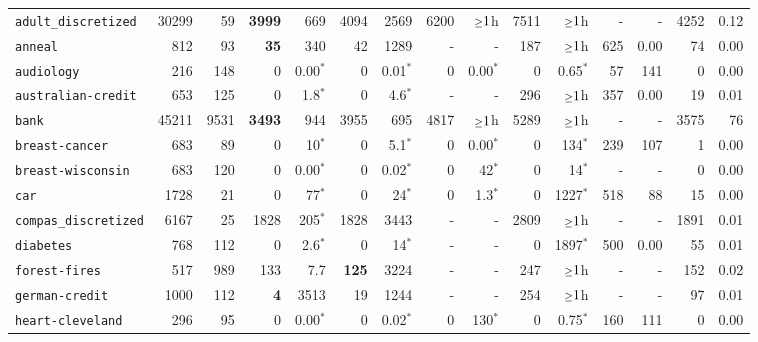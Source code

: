 \begin{tabular}{lccrrrrrrrrrrrr}
\texttt{adult\_discretized} & \multicolumn{1}{r}{30299} & \multicolumn{1}{r}{59}  & \textbf{3999} & 669 & 4094 & 2569 & 6200 & $\mathsmaller{\geq}1$h & 7511 & $\mathsmaller{\geq}1$h & - & - & 4252 & 0.12\\
\texttt{anneal} & \multicolumn{1}{r}{812} & \multicolumn{1}{r}{93}  & \textbf{35} & 340 & 42 & 1289 & - & - & 187 & $\mathsmaller{\geq}1$h & 625 & 0.00 & 74 & 0.00\\
\texttt{audiology} & \multicolumn{1}{r}{216} & \multicolumn{1}{r}{148}  & 0 & 0.00$^*$ & 0 & 0.01$^*$ & 0 & 0.00$^*$ & 0 & 0.65$^*$ & 57 & 141 & 0 & 0.00\\
\texttt{australian-credit} & \multicolumn{1}{r}{653} & \multicolumn{1}{r}{125}  & 0 & 1.8$^*$ & 0 & 4.6$^*$ & - & - & 296 & $\mathsmaller{\geq}1$h & 357 & 0.00 & 19 & 0.01\\
\texttt{bank} & \multicolumn{1}{r}{45211} & \multicolumn{1}{r}{9531}  & \textbf{3493} & 944 & 3955 & 695 & 4817 & $\mathsmaller{\geq}1$h & 5289 & $\mathsmaller{\geq}1$h & - & - & 3575 & 76\\
\texttt{breast-cancer} & \multicolumn{1}{r}{683} & \multicolumn{1}{r}{89}  & 0 & 10$^*$ & 0 & 5.1$^*$ & 0 & 0.00$^*$ & 0 & 134$^*$ & 239 & 107 & 1 & 0.00\\
\texttt{breast-wisconsin} & \multicolumn{1}{r}{683} & \multicolumn{1}{r}{120}  & 0 & 0.00$^*$ & 0 & 0.02$^*$ & 0 & 42$^*$ & 0 & 14$^*$ & - & - & 0 & 0.00\\
\texttt{car} & \multicolumn{1}{r}{1728} & \multicolumn{1}{r}{21}  & 0 & 77$^*$ & 0 & 24$^*$ & 0 & 1.3$^*$ & 0 & 1227$^*$ & 518 & 88 & 15 & 0.00\\
\texttt{compas\_discretized} & \multicolumn{1}{r}{6167} & \multicolumn{1}{r}{25}  & 1828 & 205$^*$ & 1828 & 3443 & - & - & 2809 & $\mathsmaller{\geq}1$h & - & - & 1891 & 0.01\\
\texttt{diabetes} & \multicolumn{1}{r}{768} & \multicolumn{1}{r}{112}  & 0 & 2.6$^*$ & 0 & 14$^*$ & - & - & 0 & 1897$^*$ & 500 & 0.00 & 55 & 0.01\\
\texttt{forest-fires} & \multicolumn{1}{r}{517} & \multicolumn{1}{r}{989}  & 133 & 7.7 & \textbf{125} & 3224 & - & - & 247 & $\mathsmaller{\geq}1$h & - & - & 152 & 0.02\\
\texttt{german-credit} & \multicolumn{1}{r}{1000} & \multicolumn{1}{r}{112}  & \textbf{4} & 3513 & 19 & 1244 & - & - & 254 & $\mathsmaller{\geq}1$h & - & - & 97 & 0.01\\
\texttt{heart-cleveland} & \multicolumn{1}{r}{296} & \multicolumn{1}{r}{95}  & 0 & 0.00$^*$ & 0 & 0.02$^*$ & 0 & 130$^*$ & 0 & 0.75$^*$ & 160 & 111 & 0 & 0.00\\

\end{tabular}
